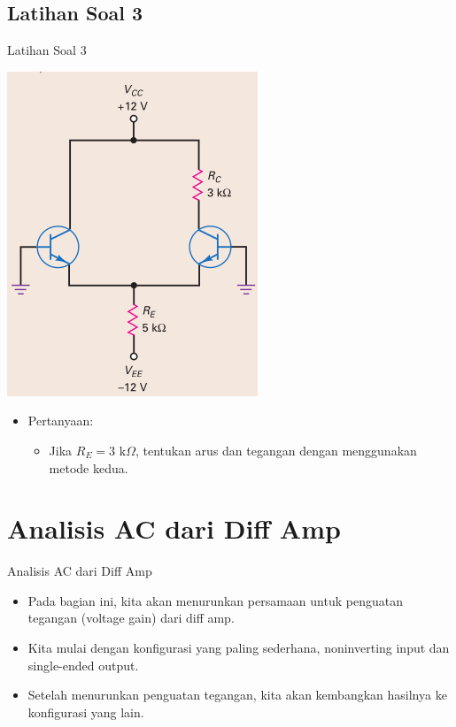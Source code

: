 \documentclass[aspectratio=169]{beamer}
\begin{document}
\subsection{Latihan Soal 3}
\begin{frame}{Latihan Soal 3}
	\begin{multicols}{2}
		\begin{center}
			\includegraphics[width=0.6\textheight]{gambar/01.latihan_soal_3}
		\end{center}
		\columnbreak
		\begin{itemize}
			\item Pertanyaan:
			\begin{itemize}
				\item Jika $ R_E = 3 \text{ k}\Omega $, tentukan arus dan tegangan dengan menggunakan metode kedua.
			\end{itemize}
		\end{itemize}
		\vfill\null
	\end{multicols}
\end{frame}

\section{Analisis AC dari Diff Amp}
\begin{frame}{Analisis AC dari Diff Amp}
	\begin{itemize}
		\item Pada bagian ini, kita akan menurunkan persamaan untuk penguatan tegangan (voltage gain) dari diff amp.
		\item Kita mulai dengan konfigurasi yang paling sederhana, noninverting input dan single-ended output.
		\item Setelah menurunkan penguatan tegangan, kita akan kembangkan hasilnya ke konfigurasi yang lain.
	\end{itemize}
\end{frame}
\end{document}
